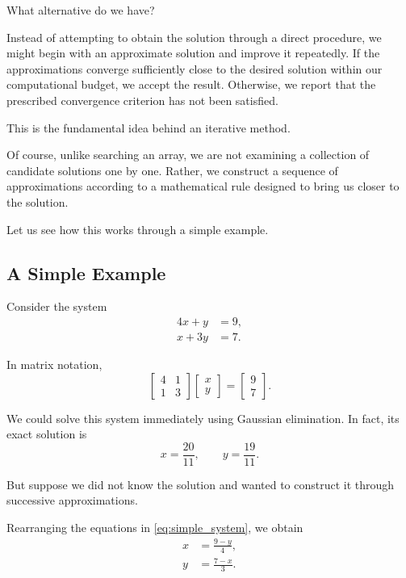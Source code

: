 \documentclass[11pt,a4paper]{article}
\theoremstyle{definition}
\theoremstyle{remark}
\begin{document}
What alternative do we have?

Instead of attempting to obtain the solution through
a direct procedure, we might begin with an approximate
solution and improve it repeatedly. If the approximations
converge sufficiently close to the desired solution
within our computational budget, we accept the result.
Otherwise, we report that the prescribed convergence
criterion has not been satisfied.

This is the fundamental idea behind an iterative method.

Of course, unlike searching an array, we are not examining
a collection of candidate solutions one by one. Rather,
we construct a sequence of approximations according to
a mathematical rule designed to bring us closer to the
solution.

Let us see how this works through a simple example.


\subsection{A Simple Example}

Consider the system
\begin{equation}
\begin{aligned}
    4x+y &= 9,\\
    x+3y &= 7.
\end{aligned}
\label{eq:simple_system}
\end{equation}

In matrix notation,
\[
    \begin{bmatrix}
        4 & 1\\
        1 & 3
    \end{bmatrix}
    \begin{bmatrix}
        x\\y
    \end{bmatrix}
    =
    \begin{bmatrix}
        9\\7
    \end{bmatrix}.
\]

We could solve this system immediately using Gaussian
elimination. In fact, its exact solution is
\[
    \boxed{
        x=\frac{20}{11},
        \qquad
        y=\frac{19}{11}.
    }
\]

But suppose we did not know the solution and wanted
to construct it through successive approximations.

Rearranging the equations in \eqref{eq:simple_system},
we obtain
\begin{equation}
\begin{aligned}
    x &= \frac{9-y}{4},\\
    y &= \frac{7-x}{3}.
\end{aligned}
\label{eq:simple_rearranged}
\end{equation}
\end{document}
